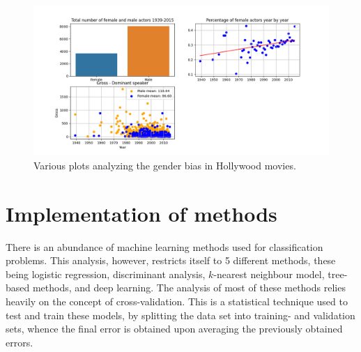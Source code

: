 \documentclass{article}
\begin{document}

\begin{figure}[ht!]
    \centering
    \includegraphics[width=120mm]{img/data_analysis.png}
    \caption{Various plots analyzing the gender bias in Hollywood movies.}
    \label{fig:dataanalysis}
\end{figure}

\section{Implementation of methods}
There is an abundance of machine learning methods used for classification problems. This analysis, however, restricts itself to 5 different methods, these being logistic regression, discriminant analysis, $k$-nearest neighbour model, tree-based methods, and deep learning. The analysis of most of these methods relies heavily on the concept of cross-validation. This is a statistical technique used to test and train these models, by splitting the data set into training- and validation sets, whence the final error is obtained upon averaging the previously obtained errors.
\end{document}
